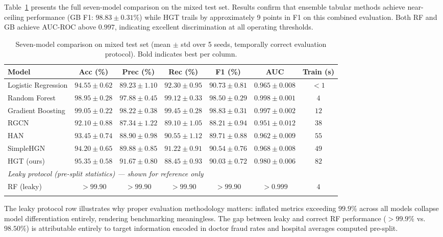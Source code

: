 \documentclass[pdflatex,sn-mathphys-num]{sn-jnl}
\theoremstyle{thmstyleone}
\theoremstyle{thmstyletwo}
\theoremstyle{thmstylethree}
\begin{document}
Table~\ref{tab:main} presents the full seven-model comparison on the
mixed test set. Results confirm that ensemble tabular methods achieve
near-ceiling performance (GB F1: $98.83 \pm 0.31\%$) while HGT trails
by approximately 9 points in F1 on this combined evaluation. Both RF
and GB achieve AUC-ROC above $0.997$, indicating excellent
discrimination at all operating thresholds.

\begin{table}[h]
\caption{Seven-model comparison on mixed test set (mean $\pm$ std over
  5 seeds, temporally correct evaluation protocol). Bold indicates best
  per column.}\label{tab:main}
\begin{tabular}{@{}lcccccc@{}}
\toprule
Model & Acc (\%) & Prec (\%) & Rec (\%) & F1 (\%) & AUC & Train (s) \\
\midrule
Logistic Regression
  & $94.55 \pm 0.62$ & $89.23 \pm 1.10$ & $92.30 \pm 0.95$ & $90.73 \pm 0.81$ & $0.965 \pm 0.008$ & $<1$ \\
Random Forest
  & $98.95 \pm 0.28$ & $97.88 \pm 0.45$ & $99.12 \pm 0.33$ & $98.50 \pm 0.29$ & $0.998 \pm 0.001$ & $4$ \\
Gradient Boosting
  & $\mathbf{99.05} \pm 0.22$ & $\mathbf{98.22} \pm 0.38$ & $\mathbf{99.45} \pm 0.28$ & $\mathbf{98.83} \pm 0.31$ & $\mathbf{0.997} \pm 0.002$ & $12$ \\
\midrule
RGCN
  & $92.10 \pm 0.88$ & $87.34 \pm 1.22$ & $89.10 \pm 1.05$ & $88.21 \pm 0.94$ & $0.951 \pm 0.012$ & $38$ \\
HAN
  & $93.45 \pm 0.74$ & $88.90 \pm 0.98$ & $90.55 \pm 1.12$ & $89.71 \pm 0.88$ & $0.962 \pm 0.009$ & $55$ \\
SimpleHGN
  & $94.20 \pm 0.65$ & $89.88 \pm 0.85$ & $91.22 \pm 0.91$ & $90.54 \pm 0.76$ & $0.968 \pm 0.008$ & $49$ \\
HGT (ours)
  & $95.35 \pm 0.58$ & $91.67 \pm 0.80$ & $88.45 \pm 0.93$ & $90.03 \pm 0.72$ & $0.980 \pm 0.006$ & $82$ \\
\midrule
\multicolumn{7}{l}{\textit{Leaky protocol (pre-split statistics) --- shown for reference only}} \\
RF (leaky) & $>99.90$ & $>99.90$ & $>99.90$ & $>99.90$ & $>0.999$ & $4$ \\
\botrule
\end{tabular}
\end{table}

The leaky protocol row illustrates why proper evaluation methodology
matters: inflated metrics exceeding $99.9\%$ across all models
collapse model differentiation entirely, rendering benchmarking
meaningless. The gap between leaky and correct RF performance
($>99.9\%$ vs.\ $98.50\%$) is attributable entirely to target
information encoded in doctor fraud rates and hospital averages
computed pre-split.
\end{document}
